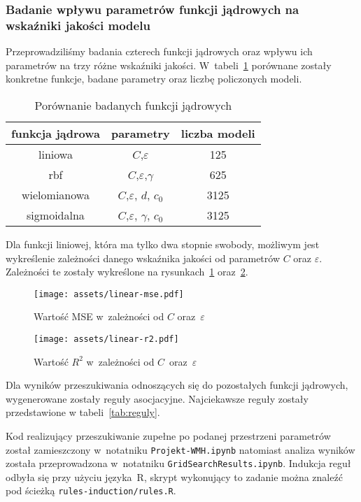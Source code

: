 \subsubsection{Badanie wpływu parametrów funkcji jądrowych na wskaźniki jakości modelu}
Przeprowadziliśmy badania czterech funkcji jądrowych oraz wpływu ich parametrów na trzy różne wskaźniki jakości. W~tabeli~\ref{tab:modele} porównane zostały konkretne funkcje, badane parametry oraz liczbę policzonych modeli.

\begin{table}[tb]
 \centering
 \begin{tabular}{||c c c||} 
 \hline
 funkcja jądrowa & parametry & liczba modeli \\ [0.5ex]
 \hline\hline
 liniowa & $C$,$\varepsilon$ & 125  \\ 
 \hline
 rbf & $C$,$\varepsilon$,$\gamma$ & 625 \\
 \hline
 wielomianowa & $C$,$\varepsilon$, $d$, $c_{0}$ & 3125 \\
 \hline
 sigmoidalna & $C$,$\varepsilon$, $\gamma$, $c_{0}$ & 3125 \\
 \hline 
\end{tabular}

 \caption{Porównanie badanych funkcji jądrowych \label{tab:modele}}
\end{table}

Dla funkcji liniowej, która ma tylko dwa stopnie swobody, możliwym jest wykreślenie zależności danego wskaźnika jakości od parametrów $C$ oraz $\varepsilon$. Zależności te zostały wykreślone na rysunkach~\ref{fig:mse} oraz~\ref{fig:r2}.

\begin{figure}[h]
    \centering
    \texttt{[image: assets/linear-mse.pdf]}
    \caption{Wartość MSE w~zależności od $C$ oraz~$\varepsilon$}
    \label{fig:mse}
\end{figure}

\begin{figure}[h]
    \centering
    \texttt{[image: assets/linear-r2.pdf]}
    \caption{Wartość $R^2$ w~zależności od $C$~oraz~$\varepsilon$}
    \label{fig:r2}
\end{figure}

Dla wyników przeszukiwania odnoszących się do pozostałych funkcji jądrowych, wygenerowane zostały reguły asocjacyjne. Najciekawsze reguły zostały przedstawione w tabeli~\ref{tab:reguly}.

Kod realizujący przeszukiwanie zupełne po podanej przestrzeni parametrów został zamieszczony w~notatniku \texttt{Projekt-WMH.ipynb} natomiast analiza wyników została przeprowadzona w~notatniku \texttt{GridSearchResults.ipynb}. Indukcja reguł odbyła się przy użyciu języka~R, skrypt wykonujący to zadanie można znaleźć pod ścieżką \texttt{rules-induction/rules.R}.

